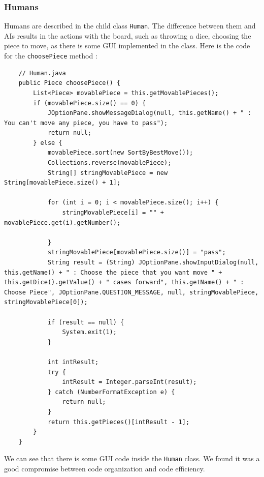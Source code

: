 \documentclass[english, 11pt, titlepage]{article}
\begin{document}
    \subsubsection{Humans}
    Humans are described in the child class \verb|Human|. The difference between them and AIs results in the actions with the board, such as throwing a dice, choosing the piece to move, as there is some GUI implemented in the class. Here is the code for the \verb|choosePiece| method :
    \begin{lstlisting}
    // Human.java
    public Piece choosePiece() {
        List<Piece> movablePiece = this.getMovablePieces();
        if (movablePiece.size() == 0) {
            JOptionPane.showMessageDialog(null, this.getName() + " : You can't move any piece, you have to pass");
            return null;
        } else {
            movablePiece.sort(new SortByBestMove());
            Collections.reverse(movablePiece);
            String[] stringMovablePiece = new String[movablePiece.size() + 1];

            for (int i = 0; i < movablePiece.size(); i++) {
                stringMovablePiece[i] = "" + movablePiece.get(i).getNumber();

            }
            stringMovablePiece[movablePiece.size()] = "pass";
            String result = (String) JOptionPane.showInputDialog(null, this.getName() + " : Choose the piece that you want move " + this.getDice().getValue() + " cases forward", this.getName() + " : Choose Piece", JOptionPane.QUESTION_MESSAGE, null, stringMovablePiece, stringMovablePiece[0]);

            if (result == null) {
                System.exit(1);
            }

            int intResult;
            try {
                intResult = Integer.parseInt(result);
            } catch (NumberFormatException e) {
                return null;
            }
            return this.getPieces()[intResult - 1];
        }
    }
    \end{lstlisting}
    We can see that there is some GUI code inside the \verb|Human| class. We found it was a good compromise between code organization and code efficiency.
\end{document}
